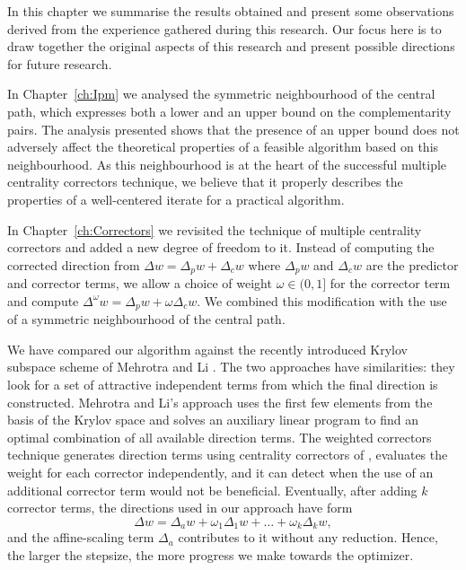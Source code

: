 
%
%
\label{ch:Conclusions}

In this chapter we summarise the results obtained and 
present some observations derived from the experience
gathered during this research.
Our focus here is to draw together the original aspects of this research
and present possible directions for future research.

In Chapter~\ref{ch:Ipm} we analysed the symmetric neighbourhood
of the central path, which expresses both a lower and an upper bound
on the complementarity pairs.
The analysis presented shows that the presence of an upper bound does not
adversely affect the theoretical properties of a feasible algorithm
based on this neighbourhood.
As this neighbourhood is at the heart of the successful multiple
centrality correctors technique, we believe that it properly describes
the properties of a well-centered iterate for a practical algorithm.

In Chapter~\ref{ch:Correctors} we revisited the 
technique of multiple centrality correctors \cite{Gondzio96} 
and added a new degree of freedom to it. 
Instead of computing the corrected direction from 
$\Delta w = \Delta_p w + \Delta_c w$ where 
$\Delta_p w$ and $\Delta_c w$ are the predictor and corrector terms, 
we allow a choice of weight 
$\omega \in (0,1]$ for the corrector term and compute 
$\Delta^\omega w = \Delta_p w + \omega \Delta_c w$.
We combined this modification with the use of a symmetric neighbourhood
of the central path. 

We have compared our algorithm against the recently introduced 
Krylov subspace scheme of Mehrotra and Li \cite{MehrotraLi}.
The two approaches have similarities: they look for a set of attractive 
independent terms from which the final direction is constructed. 
Mehrotra and Li's approach uses the first few elements from the basis
of the Krylov space and solves an auxiliary linear program to find an
optimal combination of all available direction terms.
The weighted correctors technique generates direction terms using 
centrality correctors of \cite{Gondzio96}, evaluates the weight
for each corrector independently, and it can detect when the use
of an additional corrector term would not be beneficial.
Eventually, after adding $k$ corrector terms, 
the directions used in our approach have form
\[
  \Delta w = \Delta_a w + \omega_1\Delta_1 w + \ldots + \omega_k\Delta_k w,
\]
and the affine-scaling term $\Delta_a$ contributes to it without any
reduction. Hence, the larger the stepsize, the more progress we make
towards the optimizer.

